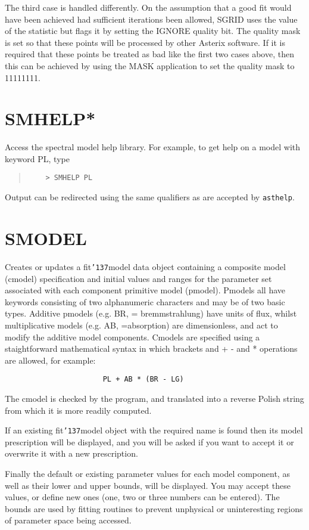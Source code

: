 \documentclass{book}
\renewcommand{\_}{{\tt\char'137}}     %
\begin{document}
The third case is handled differently. On the assumption that a
good fit would have been achieved had sufficient iterations been
allowed, SGRID uses the value of the statistic but flags it by
setting the IGNORE quality bit. The quality mask is set so that
these points will be processed by other Asterix software. If it
is required that these points be treated as bad like the first
two cases above, then this can be achieved by using the MASK
application to set the quality mask to 11111111.
 
\section{SMHELP*}
Access the spectral model help library. For example, to get help
on a model with keyword PL, type
\begin{quote}\begin{verbatim}
    > SMHELP PL
\end{verbatim}\end{quote}
Output can be redirected using the same qualifiers as are accepted
by {\tt asthelp}.
 
\section{SMODEL}
Creates or updates a fit\_model data object containing a composite
model (cmodel) specification and initial values and ranges for
the parameter set associated with each component primitive model
(pmodel). Pmodels all have keywords consisting of two
alphanumeric characters and may be of two basic types. Additive
pmodels (e.g. BR, = bremmstrahlung) have units of flux, whilst
multiplicative models (e.g. AB, =absorption) are dimensionless,
and act to modify the additive model components. Cmodels are
specified using a staightforward mathematical syntax in which
brackets and + - and * operations are allowed, for example:
\begin{verbatim}
                       PL + AB * (BR - LG)
\end{verbatim}
The cmodel is checked by the program, and translated into a
reverse Polish string from which it is more readily computed.
 
If an existing fit\_model object with the required name is found
then its model prescription will be displayed, and you will be
asked if you want to accept it or overwrite it with a new
prescription.
 
Finally the default or existing parameter values for each model
component, as well as their lower and upper bounds, will be
displayed. You may accept these values, or define new ones (one,
two or three numbers can be entered). The bounds are used by
fitting routines to prevent unphysical or uninteresting regions
of parameter space being accessed.
 
\end{document}
